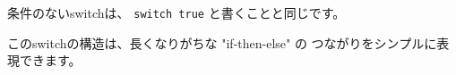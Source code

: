 条件のないswitchは、 \texttt{switch true} と書くことと同じです。

このswitchの構造は、長くなりがちな "if-then-else" の
つながりをシンプルに表現できます。